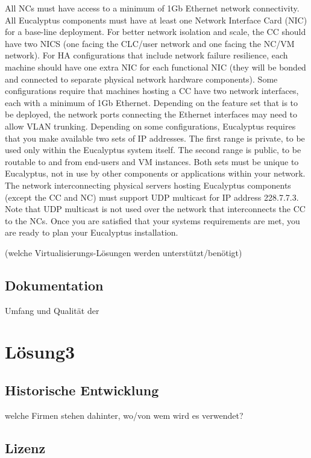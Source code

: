 \documentclass[a4paper,nochapterprefix,ngerman,12pt]{scrreprt}
\begin{document}
All NCs must have access to a minimum of 1Gb Ethernet network connectivity.
All Eucalyptus components must have at least one Network Interface Card (NIC) for a base-line deployment. For better network isolation and scale, the CC should have two NICS (one facing the CLC/user network and one facing the NC/VM network). For HA configurations that include network failure resilience, each machine should have one extra NIC for each functional NIC (they will be bonded and connected to separate physical network hardware components).
Some configurations require that machines hosting a CC have two network interfaces, each with a minimum of 1Gb Ethernet.
Depending on the feature set that is to be deployed, the network ports connecting the Ethernet interfaces may need to allow VLAN trunking.
Depending on some configurations, Eucalyptus requires that you make available two sets of IP addresses. The first range is private, to be used only within the Eucalyptus system itself. The second range is public, to be routable to and from end-users and VM instances. Both sets must be unique to Eucalyptus, not in use by other components or applications within your network.
The network interconnecting physical servers hosting Eucalyptus components (except the CC and NC) must support UDP multicast for IP address 228.7.7.3. Note that UDP multicast is not used over the network that interconnects the CC to the NCs.
Once you are satisfied that your systems requirements are met, you are ready to plan your Eucalyptus installation.




(welche Virtualisierungs-Lösungen werden unterstützt/benötigt)

\section{Dokumentation}
Umfang und Qualität der

\chapter{Lösung3} \thispagestyle{fancy}
\section{Historische Entwicklung}
welche Firmen stehen dahinter, wo/von wem wird es verwendet?
\section{Lizenz}
\end{document}
